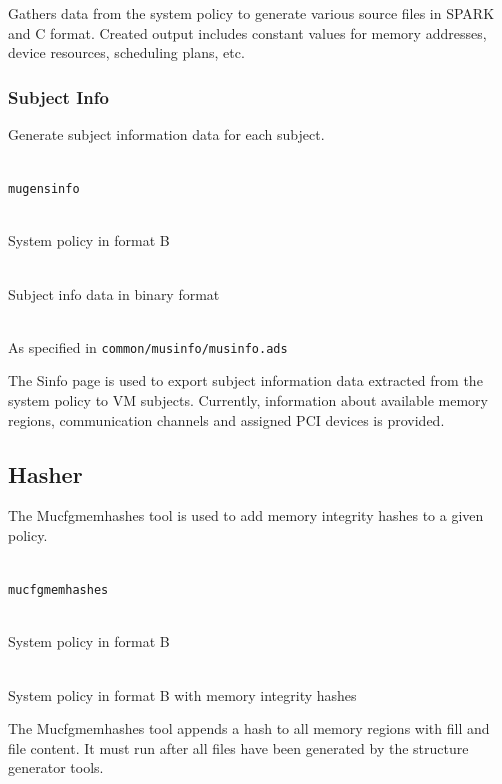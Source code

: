 \documentclass[a4paper,twoside,titlepage]{article}
\begin{document}
Gathers data from the system policy to generate various source files in SPARK
and C format. Created output includes constant values for memory addresses,
device resources, scheduling plans, etc.

\subsubsection{Subject Info}
Generate subject information data for each subject.

\begin{description} \itemsep1pt \parskip0pt
	\item[Name] \hfill \\
		\texttt{mugensinfo}
	\item[Input] \hfill \\
		System policy in format B
	\item[Output] \hfill \\
		Subject info data in binary format
	\item[Output format] \hfill \\
		As specified in \texttt{common/musinfo/musinfo.ads}
\end{description}

The Sinfo page is used to export subject information data extracted from the
system policy to VM subjects. Currently, information about available memory
regions, communication channels and assigned PCI devices is provided.

\subsection{Hasher}
The Mucfgmemhashes tool is used to add memory integrity hashes to a given
policy.

\begin{description} \itemsep1pt \parskip0pt
	\item[Name] \hfill \\
		\texttt{mucfgmemhashes}
	\item[Input] \hfill \\
		System policy in format B
	\item[Output] \hfill \\
		System policy in format B with memory integrity hashes
\end{description}

The Mucfgmemhashes tool appends a hash to all memory regions with fill and file
content. It must run after all files have been generated by the structure
generator tools.
\end{document}
